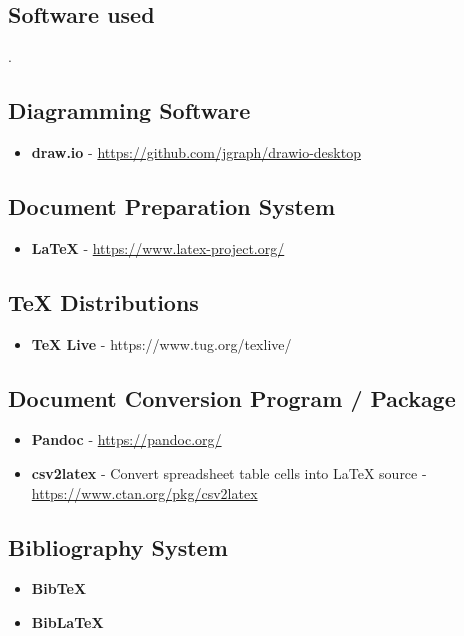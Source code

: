 \begin{appendices}
\chapter{Software used}.

\section{Diagramming Software}
\begin{itemize}
\item \textbf{draw.io} - \url{https://github.com/jgraph/drawio-desktop}
\end{itemize}

\section{Document Preparation System}
\begin{itemize}
\item \textbf{{\LaTeX}} - \url{https://www.latex-project.org/}
\end{itemize}

\section{TeX Distributions}
\begin{itemize}
\item \textbf{TeX Live} - https://www.tug.org/texlive/
\end{itemize}

\section{Document Conversion Program / Package}
\begin{itemize}
\item \textbf{Pandoc} - \url{https://pandoc.org/}
\item \textbf{csv2latex} - Convert spreadsheet table cells into {\LaTeX} source - \url{https://www.ctan.org/pkg/csv2latex}
\end{itemize}

\section{Bibliography System}
\begin{itemize}
\item \textbf{BibTeX}
\item \textbf{BibLaTeX}
\end{itemize}


\end{appendices}

